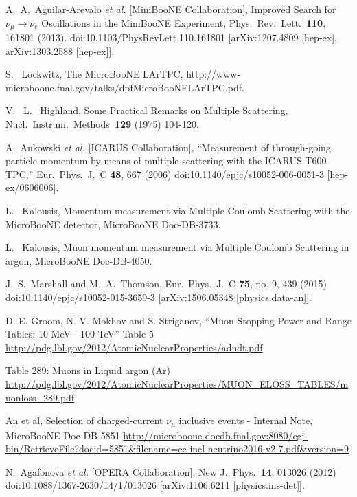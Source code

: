\begin{thebibliography}{1}

  A.~A.~Aguilar-Arevalo {\it et al.} 
  [MiniBooNE Collaboration],
  Improved Search for $\bar \nu_\mu \rightarrow \bar \nu_e$ Oscillations in the MiniBooNE Experiment,
  Phys.\ Rev.\ Lett.\  {\bf 110}, 161801 (2013).
  doi:10.1103/PhysRevLett.110.161801
  [arXiv:1207.4809 [hep-ex], arXiv:1303.2588 [hep-ex]].

  S. ~Lockwitz, 
  The MicroBooNE LArTPC,
  http://www-microboone.fnal.gov/talks/dpfMicroBooNELArTPC.pdf.

  V. ~L. ~Highland, 
  Some Practical Remarks on Multiple Scattering, 
  Nucl.\ Instrum.\ Methods\ {\bf 129} (1975)
  104-120.
 
  A.~Ankowski {\it et al.} [ICARUS Collaboration],
  ``Measurement of through-going particle momentum by means of multiple scattering with the ICARUS T600 TPC,''
  Eur.\ Phys.\ J.\ C {\bf 48}, 667 (2006)
  doi:10.1140/epjc/s10052-006-0051-3
  [hep-ex/0606006].

  L. ~Kalousis, 
  Momentum measurement via Multiple Coulomb
  Scattering with the MicroBooNE detector, 
  MicroBooNE Doc-DB-3733.


  L. ~Kalousis, 
  Muon momentum measurement via Multiple Coulomb Scattering in argon,
  MicroBooNE Doc-DB-4050.

  J.~S.~Marshall and M.~A.~Thomson,
  Eur.\ Phys.\ J.\ C {\bf 75}, no. 9, 439 (2015)
  doi:10.1140/epjc/s10052-015-3659-3
  [arXiv:1506.05348 [physics.data-an]].

  D. E. Groom, N. V. Mokhov and S. Striganov, ``Muon Stopping Power and Range Tables: 10 MeV - 100 TeV'' Table 5
  \url{http://pdg.lbl.gov/2012/AtomicNuclearProperties/adndt.pdf}


   Table 289: Muons in Liquid argon (Ar) \url{http://pdg.lbl.gov/2012/AtomicNuclearProperties/MUON_ELOSS_TABLES/muonloss_289.pdf}

  An et al,
  Selection of charged-current $\nu_\mu$ inclusive events - Internal Note,
  MicroBooNE Doc-DB-5851
  \url{http://microboone-docdb.fnal.gov:8080/cgi-bin/RetrieveFile?docid=5851&filename=cc-incl-neutrino2016-v2.7.pdf&version=9}

  N.~Agafonova {\it et al.} [OPERA Collaboration],
  New J.\ Phys.\  {\bf 14}, 013026 (2012)
  doi:10.1088/1367-2630/14/1/013026
  [arXiv:1106.6211 [physics.ins-det]].


\end{thebibliography}